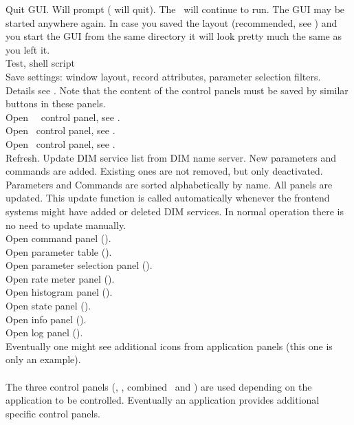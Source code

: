  Quit GUI. Will prompt ( will quit). The \dabc\ will continue to run.
The GUI may be started anywhere again. In case you saved the layout (recommended, see )
and you start the GUI from the same directory it will look pretty much the same as you left it. \\
 Test, shell script\\
 Save settings: window layout, record attributes, parameter selection filters.
Details see . Note that the content of the control panels
must be saved by similar buttons in these panels.\\
 Open \dabc\ \mbs\ control panel, see .\\
 Open \dabc\ control panel, see .\\
 Open \mbs\ control panel, see .\\
 Refresh. Update DIM service list from DIM name server.
New parameters and commands are added. Existing ones are not removed,
but only deactivated. Parameters and Commands are sorted alphabetically by name.
All panels are updated.
This update function is called automatically whenever the frontend systems might have
added or deleted DIM services. In normal operation there is no need to update manually.\\
 Open command panel ().\\
 Open parameter table ().\\
 Open parameter selection panel ().\\
 Open rate meter panel ().\\
 Open histogram panel ().\\
 Open state panel ().\\
 Open info panel ().\\
 Open log panel ().\\
 Eventually one might see additional icons from application panels
(this one is only an example).\\\\
The three control panels (\dabc, \mbs, combined \dabc\ and \mbs) 
are used depending on the
application to be controlled. Eventually an application provides 
additional specific control panels.

